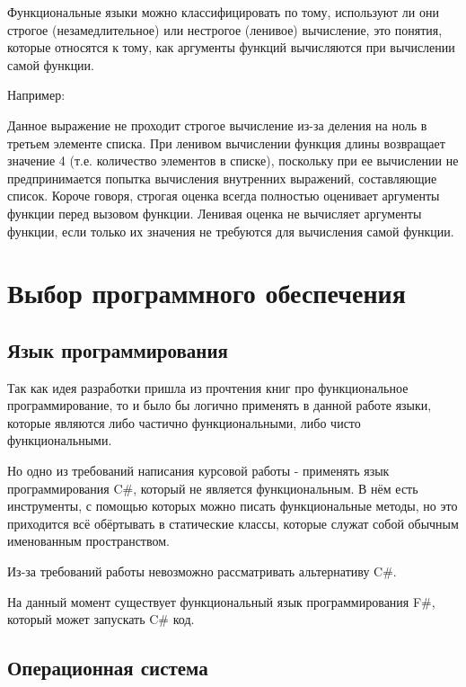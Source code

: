 Функциональные языки можно классифицировать по тому, используют ли они строгое (незамедлительное) или нестрогое (ленивое) вычисление, это понятия, которые относятся к тому, как аргументы функций вычисляются при вычислении самой функции.

Например:

\begin{code}
	
\end{code}

Данное выражение не проходит строгое вычисление из-за деления на ноль в третьем элементе списка.
При ленивом вычислении функция длины возвращает значение 4 (т.е. количество элементов в списке), поскольку при ее вычислении не предпринимается попытка вычисления внутренних выражений, составляющие список.
Короче говоря, строгая оценка всегда полностью оценивает аргументы функции перед вызовом функции.
Ленивая оценка не вычисляет аргументы функции, если только их значения не требуются для вычисления самой функции.


\newpage
\section{Выбор программного обеспечения}

\subsection{Язык программирования}

Так как идея разработки пришла из прочтения книг про функциональное программирование, то и было бы логично применять в данной работе языки, которые являются либо частично функциональными, либо чисто функциональными.

Но одно из требований написания курсовой работы - применять язык программирования C\#, который не является функциональным.
В нём есть инструменты, с помощью которых можно писать функциональные методы, но это приходится всё обёртывать в статические классы, которые служат собой обычным именованным пространством.

Из-за требований работы невозможно рассматривать альтернативу C\#.

На данный момент существует функциональный язык программирования F\#, который может запускать C\# код.

\subsection{Операционная система}

